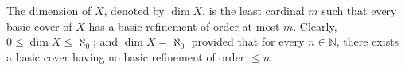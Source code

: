 The dimension of $X$, denoted by $\dim X$, is the least cardinal $m$ such that every basic cover of $X$ has a basic refinement of order at most $m$. Clearly, $0 \leq \dim X \leq \aleph_0$; and $\dim X = \aleph_0$ provided that for every $n \in \mathbb{N}$, there exists a basic cover having no basic refinement of order $\leq n$.
